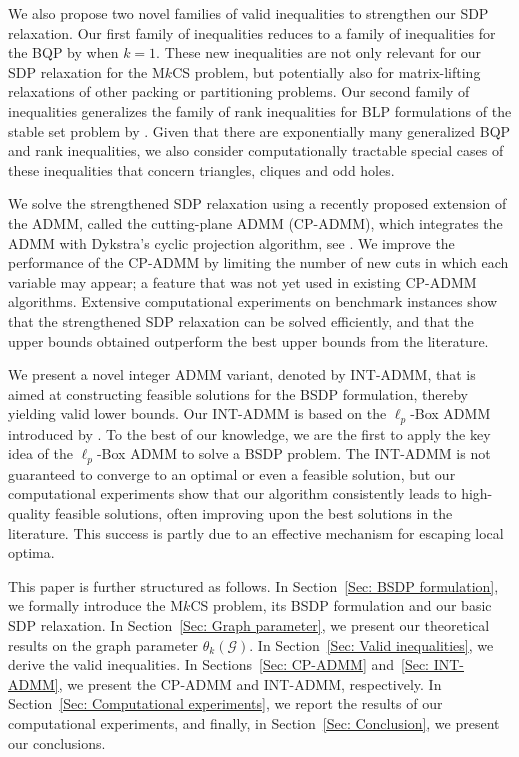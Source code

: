 \documentclass[11pt, a4paper]{article}
\newcommand{\mc}{\mathcal}
\begin{document}
We also propose two novel families of valid inequalities to strengthen our SDP relaxation.
Our first family of inequalities reduces to a family of inequalities for the BQP by \citet{Padberg1989BQP} when $k=1$.
These new inequalities are not only relevant for our SDP relaxation for the M$k$CS problem, but potentially also for matrix-lifting relaxations of other packing or partitioning problems.
Our second family of inequalities generalizes the family of rank inequalities for BLP formulations of the stable set problem by \citet{Nemhauser1974PropertiesPolyhedra}. 
Given that there are exponentially many generalized BQP and rank inequalities, we also consider computationally tractable special cases of these inequalities that concern triangles, cliques and odd holes.

We solve the strengthened SDP relaxation using a recently proposed extension of the ADMM, called the cutting-plane ADMM (CP-ADMM), which integrates the ADMM with Dykstra's cyclic projection algorithm, see \cite{deMeijer2025ADMMQMSTP, deMeijer2021QCCP, deMeijer2023ADMMPartitioning}.
We improve the performance of the CP-ADMM by limiting the number of new cuts in which each variable may appear; a feature that was not yet used in existing CP-ADMM algorithms.
Extensive computational experiments on benchmark instances show that the strengthened SDP relaxation can be solved efficiently, and that the upper bounds obtained outperform the best upper bounds from the literature.

We  present a novel integer ADMM variant, denoted by INT-ADMM, that is aimed at constructing feasible solutions for the BSDP formulation, thereby yielding valid lower bounds.
Our INT-ADMM is based on the $\ell_p$-Box ADMM introduced by \citet{Wu2019LpBoxADMM}. To the best of our knowledge, we are the first to apply the key idea of the $\ell_p$-Box ADMM to solve a BSDP problem.
The INT-ADMM is not guaranteed to converge to an optimal or even a feasible solution, but our computational experiments show that our algorithm consistently leads to high-quality feasible solutions, often improving upon the best solutions in the literature. 
This success is partly due to an effective mechanism for escaping local optima.

This paper is further structured as follows.
In Section~\ref{Sec: BSDP formulation}, we formally introduce the M$k$CS problem, its BSDP formulation and our basic SDP relaxation.
In Section~\ref{Sec: Graph parameter}, we present our theoretical results on the graph parameter $\theta_k(\mc{G})$.
In Section~\ref{Sec: Valid inequalities}, we derive the valid inequalities.
In Sections~\ref{Sec: CP-ADMM} and~\ref{Sec: INT-ADMM}, we present the CP-ADMM and INT-ADMM, respectively.
In Section~\ref{Sec: Computational experiments}, we report the results of our computational experiments, and finally, in Section~\ref{Sec: Conclusion}, we present our conclusions.
\end{document}
